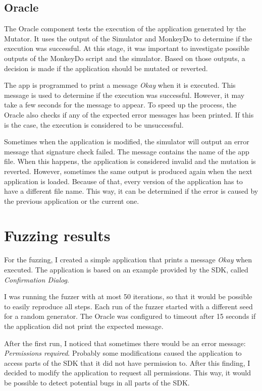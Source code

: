 \subsection*{Oracle}
The Oracle component tests the execution of the application generated by the Mutator.
It uses the output of the Simulator and MonkeyDo to determine if the execution was successful.
At this stage, it was important to investigate possible outputs of the MonkeyDo script and the simulator.
Based on those outputs, a decision is made if the application should be mutated or reverted.

The app is programmed to print a message \textit{Okay} when it is executed.
This message is used to determine if the execution was successful.
However, it may take a few seconds for the message to appear.
To speed up the process, the Oracle also checks if any of the expected error messages has been printed.
If this is the case, the execution is considered to be unsuccessful.

Sometimes when the application is modified, the simulator will output an error message that signature check failed.
The message contains the name of the app file.
When this happens, the application is considered invalid and the mutation is reverted.
However, sometimes the same output is produced again when the next application is loaded.
Because of that, every version of the application has to have a different file name.
This way, it can be determined if the error is caused by the previous application or the current one.


\section{Fuzzing results}

For the fuzzing, I created a simple application that prints a message \textit{Okay} when executed.
The application is based on an example provided by the SDK, called \textit{Confirmation Dialog}.

I was running the fuzzer with at most 50 iterations, so that it would be possible to easily reproduce all steps.
Each run of the fuzzer started with a different seed for a random generator.
The Oracle was configured to timeout after 15 seconds if the application did not print the expected message.

After the first run, I noticed that sometimes there would be an error message: \textit{Permissions required}.
Probably some modifications caused the application to access parts of the SDK that it did not have permission to.
After this finding, I decided to modify the application to request all permissions.
This way, it would be possible to detect potential bugs in all parts of the SDK\@.

